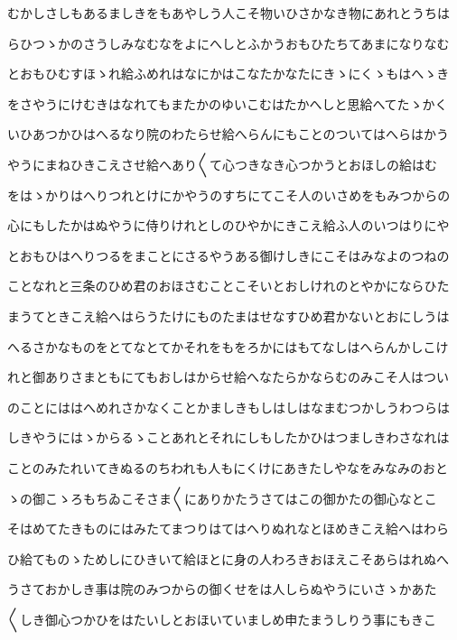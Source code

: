 \documentclass[a4paper,11pt,landscape]{ltjtarticle}
\begin{document}
\par\medskip
むかしさしもあるましきをもあやしう人こそ物いひさかなき物にあれとうちは
\par\medskip
らひつゝかのさうしみなむなをよにへしとふかうおもひたちてあまになりなむ
\par\medskip
とおもひむすほゝれ給ふめれはなにかはこなたかなたにきゝにくゝもはへゝき
\par\medskip
をさやうにけむきはなれてもまたかのゆいこむはたかへしと思給へてたゝかく
\par\medskip
いひあつかひはへるなり院のわたらせ給へらんにもことのついてはへらはかう
\par\medskip
やうにまねひきこえさせ給へあり〱て心つきなき心つかうとおほしの給はむ
\par\medskip
をはゝかりはへりつれとけにかやうのすちにてこそ人のいさめをもみつからの
\par\medskip
心にもしたかはぬやうに侍りけれとしのひやかにきこえ給ふ人のいつはりにや
\par\medskip
とおもひはへりつるをまことにさるやうある御けしきにこそはみなよのつねの
\par\medskip
ことなれと三条のひめ君のおほさむことこそいとおしけれのとやかにならひた
\par\medskip
まうてときこえ給へはらうたけにものたまはせなすひめ君かないとおにしうは
\par\medskip
へるさかなものをとてなとてかそれをもをろかにはもてなしはへらんかしこけ
\par\medskip
れと御ありさまともにてもおしはからせ給へなたらかならむのみこそ人はつい
\par\medskip
のことにははへめれさかなくことかましきもしはしはなまむつかしうわつらは
\par\medskip
しきやうにはゝからるゝことあれとそれにしもしたかひはつましきわさなれは
\par\medskip
ことのみたれいてきぬるのちわれも人もにくけにあきたしやなをみなみのおと
\par\medskip
ゝの御こゝろもちゐこそさま〱にありかたうさてはこの御かたの御心なとこ
\par\medskip
そはめてたきものにはみたてまつりはてはへりぬれなとほめきこえ給へはわら
\par\medskip
ひ給てものゝためしにひきいて給ほとに身の人わろきおほえこそあらはれぬへ
\par\medskip
うさておかしき事は院のみつからの御くせをは人しらぬやうにいさゝかあた
\par\medskip
〱しき御心つかひをはたいしとおほいていましめ申たまうしりう事にもきこ
\par\medskip
\end{document}
